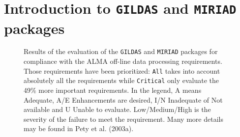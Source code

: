 \documentclass[11pt,twoside]{article}  %
\newcommand{\GILDAS}{\texttt{GILDAS}}
\newcommand{\MIRIAD}{\texttt{MIRIAD}}
\newcommand{\ALMA}{\textrm{ALMA}}
\begin{document}
%
%

\section{Introduction to \GILDAS{} and \MIRIAD{} packages}

\begin{figure}[t]
  \caption{Results of the evaluation of the \GILDAS{} and \MIRIAD{}
    packages for compliance with the \ALMA{} off-line data processing
    requirements. Those requirements have been prioritized: \texttt{All}
    takes into account absolutely all the requirements while
    \texttt{Critical} only evaluate the 49\% more important requirements.
    In the legend, A means Adequate, A/E Enhancements are desired, I/N
    Inadequate of Not available and U Unable to evaluate.  Low/Medium/High
    is the severity of the failure to meet the requirement.  Many more
    details may be found in Pety et al.  (2003a).}
  \label{fig:P4-14_f1}
\end{figure}
\end{document}
